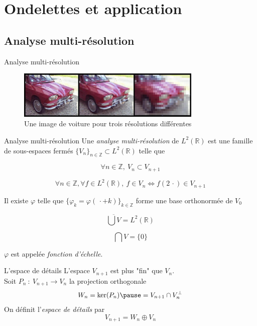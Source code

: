 \documentclass[french]{beamer}
\begin{document}
\section{Ondelettes et application}

\subsection{Analyse multi-résolution}

\begin{frame}{Analyse multi-résolution}
	
	\begin{figure}[h]
		\centering
		\includegraphics[width=250pt]{Pierre/Resolution_wikipedia.jpg}
		\caption*{Une image de voiture pour trois résolutions différentes}
	\end{figure}
\end{frame}

\begin{frame}{Analyse multi-résolution}
	Une \textit{analyse multi-résolution} de $L^2(\mathbb{R})$ est une famille de sous-espaces fermés $\{V_n\}_{n \in \mathbb{Z}} \subset L^2(\mathbb{R})$ telle que
	
	\pause
	$$\forall n \in \mathbb{Z}, ~ V_{n} \subset V_{n+1}$$

	\pause
	$$\forall n \in \mathbb{Z}, \forall f \in L^2(\mathbb{R}), ~ f \in V_n \Longleftrightarrow f (2 \, \cdot ) \in V_{n+1}$$
	
	\pause
	Il existe $\varphi$ telle que $\{\varphi_k = \varphi(\, \cdot + k)\}_{k \in \mathbb{Z}}$ forme une base orthonormée de $V_0$

	\pause
	$$\overline{\bigcup V} = L^2(\mathbb{R})$$
	
	\pause
	$$\bigcap V = \{0\}$$

	\pause			
	$\varphi$ est appelée \textit{fonction d'échelle}.
\end{frame}


\begin{frame}{L'espace de détails}
	L'espace $V_{n+1}$ est plus "fin" que $V_n$.\\
	\pause
	Soit $P_n ~ : ~ V_{n+1} \rightarrow V_n$ la projection orthogonale \pause $$W_n = \ker (P_n) \pause = V_{n+1} \cap V_n^\bot$$
	\pause
	On définit l'\textit{espace de détails} par
	$$V_{n+1} = W_n \oplus V_n$$\\
\end{frame}
\end{document}
